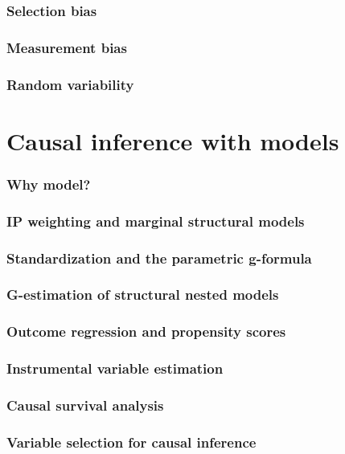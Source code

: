 \documentclass{article}
\begin{document}
\section{Selection bias}

\section{Measurement bias}

\section{Random variability}

\part*{Causal inference with models}
\section{Why model?}

\section{IP weighting and marginal structural models}

\section{Standardization and the parametric g-formula}

\section{G-estimation of structural nested models}

\section{Outcome regression and propensity scores}

\section{Instrumental variable estimation}

\section{Causal survival analysis}

\section{Variable selection for causal inference}
\end{document}
